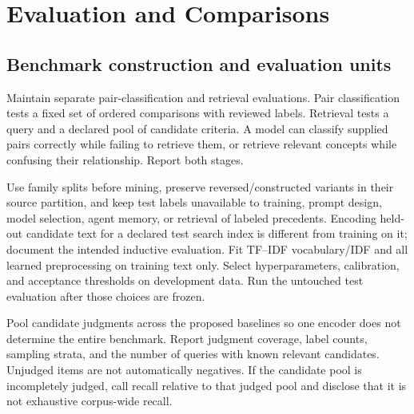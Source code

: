 \documentclass[10pt,letterpaper]{article}
\begin{document}
\section{Evaluation and Comparisons}
\label{sec:eval}

\subsection{Benchmark construction and evaluation units}
Maintain separate pair-classification and retrieval evaluations. Pair
classification tests a fixed set of ordered comparisons with reviewed labels.
Retrieval tests a query and a declared pool of candidate criteria. A model can
classify supplied pairs correctly while failing to retrieve them, or retrieve
relevant concepts while confusing their relationship. Report both stages.

Use family splits before mining, preserve reversed/constructed variants in
their source partition, and keep test labels unavailable to training,
prompt design, model selection, agent memory, or retrieval of labeled
precedents. Encoding held-out candidate text for a declared test search index
is different from training on it; document the intended inductive evaluation.
Fit TF--IDF vocabulary/IDF and all learned preprocessing on training text only.
Select hyperparameters, calibration, and acceptance thresholds on development
data. Run the untouched test evaluation after those choices are frozen.

Pool candidate judgments across the proposed baselines so one encoder does
not determine the entire benchmark. Report judgment coverage, label counts,
sampling strata, and the number of queries with known relevant candidates.
Unjudged items are not automatically negatives. If the candidate pool is
incompletely judged, call recall relative to that judged pool and disclose
that it is not exhaustive corpus-wide recall.

\end{document}
